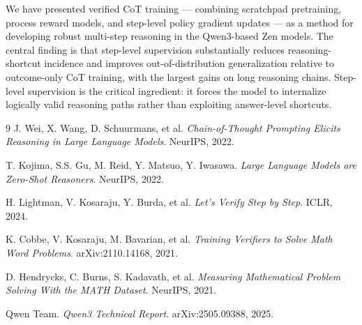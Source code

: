 \documentclass[11pt,a4paper]{article}
\begin{document}
We have presented verified CoT training — combining scratchpad pretraining, process
reward models, and step-level policy gradient updates — as a method for developing
robust multi-step reasoning in the Qwen3-based Zen models. The central finding is that
step-level supervision substantially reduces reasoning-shortcut incidence and improves
out-of-distribution generalization relative to outcome-only CoT training, with the
largest gains on long reasoning chains. Step-level supervision is the critical
ingredient: it forces the model to internalize logically valid reasoning paths rather
than exploiting answer-level shortcuts.

\begin{thebibliography}{9}
J. Wei, X. Wang, D. Schuurmans, et al.
\textit{Chain-of-Thought Prompting Elicits Reasoning in Large Language Models}.
NeurIPS, 2022.

T. Kojima, S.S. Gu, M. Reid, Y. Matsuo, Y. Iwasawa.
\textit{Large Language Models are Zero-Shot Reasoners}.
NeurIPS, 2022.

H. Lightman, V. Kosaraju, Y. Burda, et al.
\textit{Let's Verify Step by Step}.
ICLR, 2024.

K. Cobbe, V. Kosaraju, M. Bavarian, et al.
\textit{Training Verifiers to Solve Math Word Problems}.
arXiv:2110.14168, 2021.

D. Hendrycks, C. Burns, S. Kadavath, et al.
\textit{Measuring Mathematical Problem Solving With the MATH Dataset}.
NeurIPS, 2021.

Qwen Team.
\textit{Qwen3 Technical Report}.
arXiv:2505.09388, 2025.
\end{thebibliography}
\end{document}
